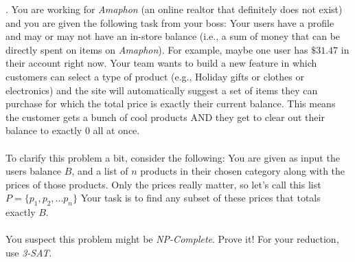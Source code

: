 \documentclass[12pt]{article}
\newcounter{quesnum}
\newcommand{\question}[2][??]{
\begin{list}{\labelitemi}{\leftmargin=2em}
\item [\arabic{quesnum}.] {} {#2}
\end{list}
\addtocounter{quesnum}{1}
}
\begin{document}
\vspace{12pt}

\question[3]{
You are working for \emph{Amaphon} (an online realtor that definitely does not exist) and you are given the following task from your boss: Your users have a profile and may or may not have an in-store balance (i.e., a sum of money that can be directly spent on items on \emph{Amaphon}). For example, maybe one user has $\$31.47$ in their account right now. Your team wants to build a new feature in which customers can select a type of product (e.g., Holiday gifts or clothes or electronics) and the site will automatically suggest a set of items they can purchase for which the total price is exactly their current balance. This means the customer gets a bunch of cool products AND they get to clear out their balance to exactly 0 all at once.\\
\\
To clarify this problem a bit, consider the following: You are given as input the users balance $B$, and a list of $n$ products in their chosen category along with the prices of those products. Only the prices really matter, so let's call this list $P=\{p_1,p_2,...p_n\}$ Your task is to find any subset of these prices that totals exactly $B$.\\
\\
You suspect this problem might be \emph{NP-Complete}. Prove it! For your reduction, use \emph{3-SAT}.
}
\end{document}
